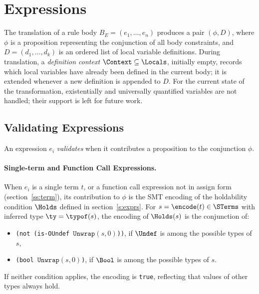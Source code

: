 \section{Expressions}
\label{s:expr:t}

The translation of a rule body $B_E = (e_1, \dots, e_n)$ produces a pair $(\phi, D)$, where $\phi$ is a proposition representing the conjunction of all body constraints, and $D = (d_1, \dots, d_k)$ is an ordered list of local variable definitions.
During translation, a \emph{definition context} $\Context \subseteq \Locals$, initially empty, records which local variables have already been defined in the current body; it is extended whenever a new definition is appended to $D$.
For the current state of the transformation, existentially and universally quantified variables are not handled; their support is left for future work.

\subsection{Validating Expressions}
\label{ss:expr:val}

An expression $e_i$ \emph{validates} when it contributes a proposition to the conjunction $\phi$.

\paragraph{Single-term and Function Call Expressions.}
When $e_i$ is a single term $t$, or a function call expression not in assign form (section~\ref{ss:term}), its contribution to $\phi$ is the SMT encoding of the holdability condition $\Holds$ defined in section~\ref{s:exprs}.
For $s = \encode(t) \in \STerms$ with inferred type $\ty = \typof(s)$, the encoding of $\Holds(s)$ is the conjunction of:
\begin{itemize}
  \item \texttt{(not (is-OUndef $\texttt{Unwrap}(s, 0)$))}, if $\Undef$ is among the possible types of $s$,
  \item \texttt{(bool $\texttt{Unwrap}(s, 0)$)}, if $\Bool$ is among the possible types of $s$.
\end{itemize}
If neither condition applies, the encoding is \texttt{true}, reflecting that values of other types always hold.

